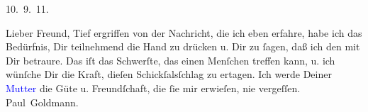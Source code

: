 \pstart
           \centering{}10. 9. 11.\pend
           
\pstart{}Lieber Freund,\pend
\pstart
           Tief ergriffen von der Nachricht, die ich eben erfahre, habe ich das Bedürfnis, Dir
               teilnehmend die Hand zu drücken u. Dir zu ſagen, daß ich den \label{K_L03476-1v}\label{K_L03476-1h} mit Dir betraure. Das iſt das Schwerſte, das einen Menſchen
               treffen  kann, u. ich wünſche Dir die Kraft, dieſen
               Schickſalsſchlag zu {\pb}ertagen. Ich werde Deiner
                  \textcolor{blue}{Mutter}{}\ledrightnote{{$\rightarrow$}\textcolor{blue}{Louise Schnitzler}} die Güte u.
               Freundſchaft, die ſie mir erwieſen, nie vergeſſen. {\\}\spacefill\mbox{Paul Goldmann.}\pend
           \endnumbering{}
\begin{anhang}
\end{anhang}
      